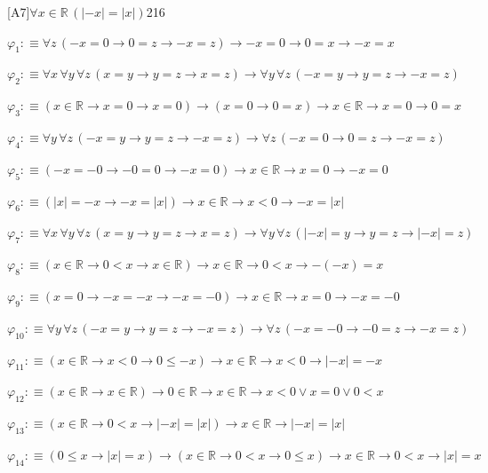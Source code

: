 \begin{fullproof}{[A7]}{$\forall x \in \mathbb{R}\,(\lvert -x \rvert = \lvert x \rvert)$}{216}
\begin{ptree}
\end{ptree}
\begin{abbrevlist}
\item $\varphi_{1} :\equiv \forall z\,(-x = 0 \to 0 = z \to -x = z) \to -x = 0 \to 0 = x \to -x = x$
\item $\varphi_{2} :\equiv \forall x\,\forall y\,\forall z\,(x = y \to y = z \to x = z) \to \forall y\,\forall z\,(-x = y \to y = z \to -x = z)$
\item $\varphi_{3} :\equiv (x \in \mathbb{R} \to x = 0 \to x = 0) \to (x = 0 \to 0 = x) \to x \in \mathbb{R} \to x = 0 \to 0 = x$
\item $\varphi_{4} :\equiv \forall y\,\forall z\,(-x = y \to y = z \to -x = z) \to \forall z\,(-x = 0 \to 0 = z \to -x = z)$
\item $\varphi_{5} :\equiv (-x = -0 \to -0 = 0 \to -x = 0) \to x \in \mathbb{R} \to x = 0 \to -x = 0$
\item $\varphi_{6} :\equiv (\lvert x \rvert = -x \to -x = \lvert x \rvert) \to x \in \mathbb{R} \to x < 0 \to -x = \lvert x \rvert$
\item $\varphi_{7} :\equiv \forall x\,\forall y\,\forall z\,(x = y \to y = z \to x = z) \to \forall y\,\forall z\,(\lvert -x \rvert = y \to y = z \to \lvert -x \rvert = z)$
\item $\varphi_{8} :\equiv (x \in \mathbb{R} \to 0 < x \to x \in \mathbb{R}) \to x \in \mathbb{R} \to 0 < x \to -(-x) = x$
\item $\varphi_{9} :\equiv (x = 0 \to -x = -x \to -x = -0) \to x \in \mathbb{R} \to x = 0 \to -x = -0$
\item $\varphi_{10} :\equiv \forall y\,\forall z\,(-x = y \to y = z \to -x = z) \to \forall z\,(-x = -0 \to -0 = z \to -x = z)$
\item $\varphi_{11} :\equiv (x \in \mathbb{R} \to x < 0 \to 0 \leq -x) \to x \in \mathbb{R} \to x < 0 \to \lvert -x \rvert = -x$
\item $\varphi_{12} :\equiv (x \in \mathbb{R} \to x \in \mathbb{R}) \to 0 \in \mathbb{R} \to x \in \mathbb{R} \to x < 0 \lor x = 0 \lor 0 < x$
\item $\varphi_{13} :\equiv (x \in \mathbb{R} \to 0 < x \to \lvert -x \rvert = \lvert x \rvert) \to x \in \mathbb{R} \to \lvert -x \rvert = \lvert x \rvert$
\item $\varphi_{14} :\equiv (0 \leq x \to \lvert x \rvert = x) \to (x \in \mathbb{R} \to 0 < x \to 0 \leq x) \to x \in \mathbb{R} \to 0 < x \to \lvert x \rvert = x$

\end{abbrevlist}
\end{fullproof}
